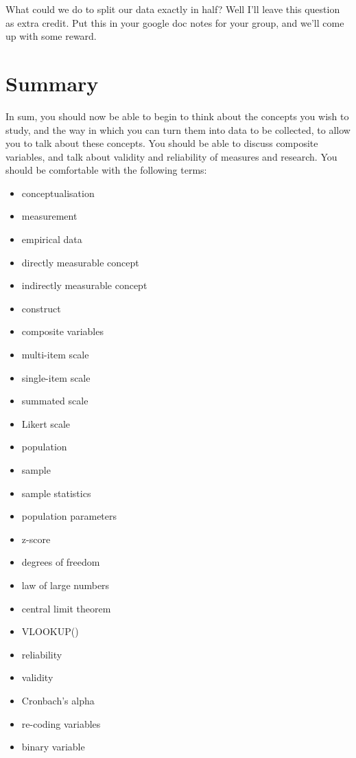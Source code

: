 \documentclass[
]{book}
\providecommand{\tightlist}{%
  \setlength{\itemsep}{0pt}\setlength{\parskip}{0pt}}
\begin{document}
What could we do to split our data exactly in half? Well I'll leave this question as extra credit. Put this in your google doc notes for your group, and we'll come up with some reward.

\hypertarget{summary-3}{%
\section{Summary}\label{summary-3}}

In sum, you should now be able to begin to think about the concepts you wish to study, and the way in which you can turn them into data to be collected, to allow you to talk about these concepts. You should be able to discuss composite variables, and talk about validity and reliability of measures and research. You should be comfortable with the following terms:

\begin{itemize}
\tightlist
\item
  conceptualisation
\item
  measurement
\item
  empirical data
\item
  directly measurable concept
\item
  indirectly measurable concept
\item
  construct
\item
  composite variables
\item
  multi-item scale
\item
  single-item scale
\item
  summated scale
\item
  Likert scale
\item
  population
\item
  sample
\item
  sample statistics
\item
  population parameters
\item
  z-score
\item
  degrees of freedom
\item
  law of large numbers
\item
  central limit theorem
\item
  VLOOKUP()
\item
  reliability
\item
  validity
\item
  Cronbach's alpha
\item
  re-coding variables
\item
  binary variable
\end{itemize}
\end{document}
